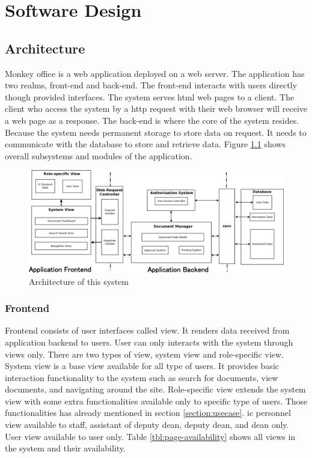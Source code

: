 \chapter{Software Design}

\section{Architecture}
Monkey office is a web application deployed on a web server.
The application has two realms, front-end and back-end.
The front-end interacts with users directly though provided interfaces.
The system serves \gls{html} web pages to a client.
The client who access the system by a \gls{http} request with their web browser will receive a web page as a response.
The back-end is where the core of the system resides.
Because the system needs permanent storage to store data on request.
It needs to communicate with the database to store and retrieve data.
Figure \ref{fig:architecutre} shows overall subsystems and modules of the application.

\begin{landscape}
	\begin{figure}
		\centering
		\caption{Architecture of this system}
		\label{fig:architecutre}
		\includegraphics[scale=0.37]{res/software-design/monkeyOffice_architecture}
	\end{figure}
\end{landscape}

\subsection{Frontend}
Frontend consists of user interfaces called view.
It renders data received from application backend to users.
User can only interacts with the system through views only.
There are two types of view, system view and role-specific view.
System view is a base view available for all type of users.
It provides basic interaction functionality to the system such as search for documents, view documents, and navigating around the site.
Role-specific view extends the system view with some extra functionalities available only to specific type of users.
Those functionalities has already mentioned in section \ref{section:usecase}.
\gls{ic} personnel view available to staff, assistant of deputy dean, deputy dean, and dean only.
User view available to user only.
Table \ref{tbl:page-availability} shows all views in the system and their availability.

